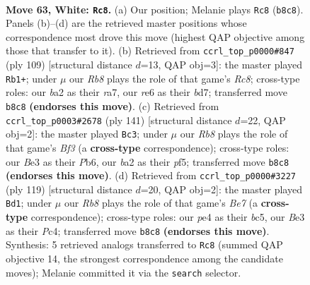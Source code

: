 \documentclass[11pt]{article}
\begin{document}
\clearpage

\begin{figure}[p]\centering
\begin{subfigure}{0.46\textwidth}\centering
\resizebox{\linewidth}{!}{%
\newchessgame
\chessboard[
  setfen={1R6/6k1/4r3/8/B3p2p/4Bp1P/b4P2/5K2 w - - 36 63},
  showmover=false,
  pgfstyle=straightmove, color=movearrow, markmove={b8-c8}
]}
\caption{}
\end{subfigure}\hfill
\begin{subfigure}{0.46\textwidth}\centering
\resizebox{\linewidth}{!}{%
\newchessgame
\chessboard[
  setfen={5k2/R2B1p2/3p4/4b1pP/1K2P1P1/8/8/2r5 b - - 26 55},
  showmover=false,
  pgfstyle=straightmove, color=movearrow, markmove={c1-b1}
]}
\caption{}
\end{subfigure}
\\[4pt]
\begin{subfigure}{0.46\textwidth}\centering
\resizebox{\linewidth}{!}{%
\newchessgame
\chessboard[
  setfen={8/p7/1p1k1b2/1P3P2/P3K2p/7P/4B3/8 b - - 17 71},
  showmover=false,
  pgfstyle=straightmove, color=movearrow, markmove={f6-c3}
]}
\caption{}
\end{subfigure}\hfill
\begin{subfigure}{0.46\textwidth}\centering
\resizebox{\linewidth}{!}{%
\newchessgame
\chessboard[
  setfen={8/8/p7/P1Bp1k2/2p4K/2P1P3/4b1P1/8 b - - 8 60},
  showmover=false,
  pgfstyle=straightmove, color=movearrow, markmove={e2-d1}
]}
\caption{}
\end{subfigure}
\caption{\textbf{Move 63, White: \texttt{Rc8}.} (a) Our position; Melanie plays \texttt{Rc8} (\texttt{b8c8}). Panels (b)--(d) are the retrieved master positions whose correspondence most drove this move (highest QAP objective among those that transfer to it). (b) Retrieved from \texttt{ccrl\_top\_p0000\#847} (ply 109) [structural distance $d$=13, QAP obj=3]: the master played \texttt{Rb1+}; under $\mu$ our \emph{Rb8} plays the role of that game's \emph{Rc8}; cross-type roles: our \emph{b}a2 as their \emph{r}a7, our \emph{r}e6 as their \emph{b}d7; transferred move \texttt{b8c8} \textbf{(endorses this move)}. (c) Retrieved from \texttt{ccrl\_top\_p0003\#2678} (ply 141) [structural distance $d$=22, QAP obj=2]: the master played \texttt{Bc3}; under $\mu$ our \emph{Rb8} plays the role of that game's \emph{Bf3} (a \textbf{cross-type} correspondence); cross-type roles: our \emph{B}e3 as their \emph{P}b6, our \emph{b}a2 as their \emph{p}f5; transferred move \texttt{b8c8} \textbf{(endorses this move)}. (d) Retrieved from \texttt{ccrl\_top\_p0000\#3227} (ply 119) [structural distance $d$=20, QAP obj=2]: the master played \texttt{Bd1}; under $\mu$ our \emph{Rb8} plays the role of that game's \emph{Be7} (a \textbf{cross-type} correspondence); cross-type roles: our \emph{p}e4 as their \emph{b}c5, our \emph{B}e3 as their \emph{P}c4; transferred move \texttt{b8c8} \textbf{(endorses this move)}. Synthesis: 5 retrieved analogs transferred to \texttt{Rc8} (summed QAP objective 14, the strongest correspondence among the candidate moves); Melanie committed it via the \texttt{search} selector.}
\label{fig:thought-m124}
\end{figure}
\end{document}
